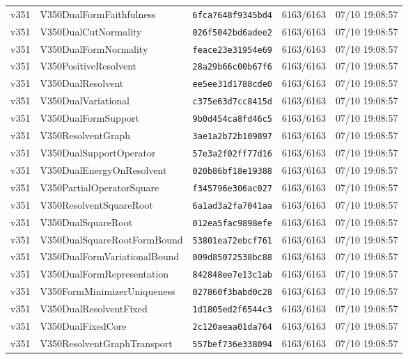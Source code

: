 \documentclass[11pt]{article}
\theoremstyle{definition}\newtheorem{deriv}{Derivation}
\begin{document}
{\begin{longtable}{@{}lllll@{}}
v351 & V350DualFormFaithfulness & \texttt{6fca7648f9345bd4} & 6163/6163 & 07/10 19:08:57 \\
v351 & V350DualCutNormality & \texttt{026f5042bd6adee2} & 6163/6163 & 07/10 19:08:57 \\
v351 & V350DualFormNormality & \texttt{feace23e31954e69} & 6163/6163 & 07/10 19:08:57 \\
v351 & V350PositiveResolvent & \texttt{28a29b66c00b67f6} & 6163/6163 & 07/10 19:08:57 \\
v351 & V350DualResolvent & \texttt{ee5ee31d1788cde0} & 6163/6163 & 07/10 19:08:57 \\
v351 & V350DualVariational & \texttt{c375e63d7cc8415d} & 6163/6163 & 07/10 19:08:57 \\
v351 & V350DualFormSupport & \texttt{9b0d454ca8fd46c5} & 6163/6163 & 07/10 19:08:57 \\
v351 & V350ResolventGraph & \texttt{3ae1a2b72b109897} & 6163/6163 & 07/10 19:08:57 \\
v351 & V350DualSupportOperator & \texttt{57e3a2f02ff77d16} & 6163/6163 & 07/10 19:08:57 \\
v351 & V350DualEnergyOnResolvent & \texttt{020b86bf18e19388} & 6163/6163 & 07/10 19:08:57 \\
v351 & V350PartialOperatorSquare & \texttt{f345796e306ac027} & 6163/6163 & 07/10 19:08:57 \\
v351 & V350ResolventSquareRoot & \texttt{6a1ad3a2fa7041aa} & 6163/6163 & 07/10 19:08:57 \\
v351 & V350DualSquareRoot & \texttt{012ea5fac9898efe} & 6163/6163 & 07/10 19:08:57 \\
v351 & V350DualSquareRootFormBound & \texttt{53801ea72ebcf761} & 6163/6163 & 07/10 19:08:57 \\
v351 & V350DualFormVariationalBound & \texttt{009d85072538bc88} & 6163/6163 & 07/10 19:08:57 \\
v351 & V350DualFormRepresentation & \texttt{842848ee7e13c1ab} & 6163/6163 & 07/10 19:08:57 \\
v351 & V350FormMinimizerUniqueness & \texttt{027860f3babd0c28} & 6163/6163 & 07/10 19:08:57 \\
v351 & V350DualResolventFixed & \texttt{1d1805ed2f6544c3} & 6163/6163 & 07/10 19:08:57 \\
v351 & V350DualFixedCore & \texttt{2c120aeaa01da764} & 6163/6163 & 07/10 19:08:57 \\
v351 & V350ResolventGraphTransport & \texttt{557bef736e338094} & 6163/6163 & 07/10 19:08:57 \\

\end{longtable}}
\end{document}
